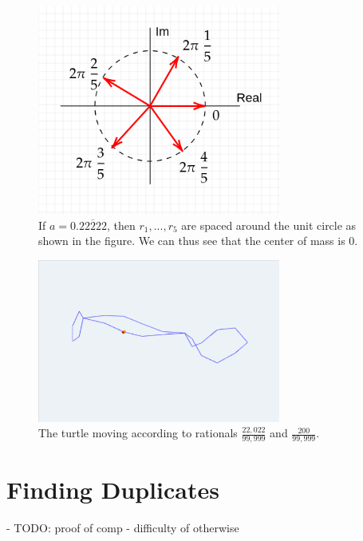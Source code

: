 \documentclass[11pt,titlepage]{article}
\begin{document}
\begin{figure}[h!]
  \centering
  \includegraphics[width=8cm]{fig/evenspacing.png}
  \caption{If $a = 0.\overline{22222}$, then $r_1, ..., r_5$ are spaced around the unit circle as shown in the figure. We can thus
  see that the center of mass is 0.}
  
\end{figure}

\begin{figure}[h!]
  \centering
  \includegraphics[width=8cm]{fig/3DTurtleCenterOfMass.png}
  \caption{The turtle moving according to rationals $\frac{22,022}{99,999}$ and $\frac{200}{99,999}$.}
\end{figure}


\pagebreak
\section{Finding Duplicates}
- TODO: proof of comp
- difficulty of otherwise
\end{document}
